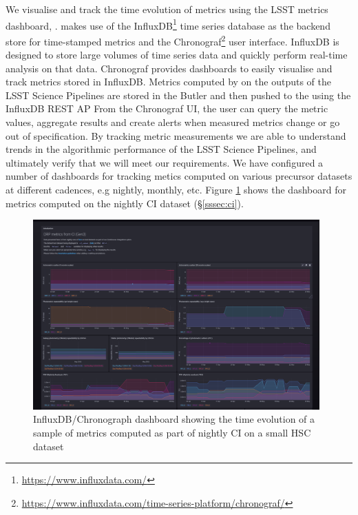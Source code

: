 We visualise and track the time evolution of \faro metrics using the LSST metrics dashboard, \squash\cite{SQR-009}. 
\squash makes use of the InfluxDB\footnote{\url{https://www.influxdata.com/}} time series database as the backend store for time-stamped metrics and the Chronograf\footnote{\url{https://www.influxdata.com/time-series-platform/chronograf/}} user interface.
InfluxDB is designed to store large volumes of time series data and quickly perform real-time analysis on that data.
Chronograf provides dashboards to easily visualise and track metrics stored in InfluxDB. 
Metrics computed by \faro on the outputs of the LSST Science Pipelines are stored in the Butler and then pushed to the \squash using  the InfluxDB REST AP
From the Chronograf UI, the user can query the metric values, aggregate results and create alerts when measured metrics change or go out of specification. 
By tracking metric measurements we are able to understand trends in the algorithmic performance of the LSST Science Pipelines, and ultimately verify that we will meet our requirements.
We have configured a number of dashboards for tracking \faro metics computed on various precursor datasets at different cadences, e.g nightly, monthly, etc. 
Figure \ref{fig:squash_metrics_ci} shows the dashboard for \faro metrics computed on the nightly CI dataset (\S \ref{sssec:ci}). 
\begin{figure}[!htp]
  \par\medskip 
  \includegraphics[width=0.98\textwidth]{figures/squash-dashboard-ci.png}
  \par\medskip   
  \caption{InfluxDB/Chronograph dashboard showing the time evolution of a sample of metrics computed as part of nightly CI on a small HSC dataset}
  \label{fig:squash_metrics_ci}
\end{figure}


